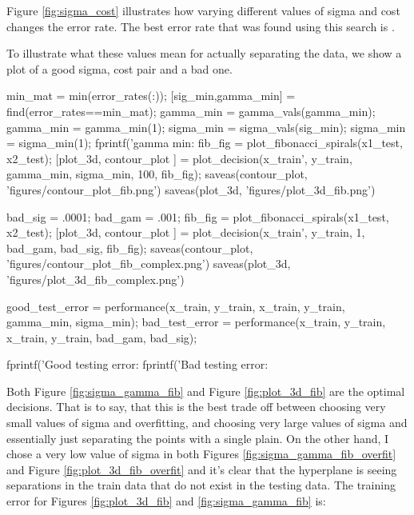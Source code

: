 \documentclass[11pt, twoside]{article}   	%
\newenvironment{matlab}{\comment}{\endcomment}
\begin{document}
Figure \ref{fig:sigma_cost} illustrates how varying different values of
sigma and cost changes the error rate. The best error rate that was found
using this search is .

To illustrate what these values mean for actually separating the data, we
show a plot of a good sigma, cost pair and a bad one. 

\begin{matlab}
min_mat = min(error_rates(:));
[sig_min,gamma_min] = find(error_rates==min_mat);
gamma_min = gamma_vals(gamma_min);
gamma_min = gamma_min(1); 
sigma_min = sigma_vals(sig_min);
sigma_min = sigma_min(1); 
fprintf('gamma min: %
fib_fig = plot_fibonacci_spirals(x1_test, x2_test); 
[plot_3d, contour_plot ] = plot_decision(x_train', y_train, gamma_min, sigma_min, 100, fib_fig);
saveas(contour_plot, 'figures/contour_plot_fib.png')
saveas(plot_3d, 'figures/plot_3d_fib.png')

bad_sig = .0001;
bad_gam = .001;
fib_fig = plot_fibonacci_spirals(x1_test, x2_test);
[plot_3d, contour_plot ] = plot_decision(x_train', y_train, 1, bad_gam, bad_sig, fib_fig);
saveas(contour_plot, 'figures/contour_plot_fib_complex.png')
saveas(plot_3d, 'figures/plot_3d_fib_complex.png')

good_test_error = performance(x_train, y_train, x_train, y_train, gamma_min, sigma_min);
bad_test_error = performance(x_train, y_train, x_train, y_train, bad_gam, bad_sig);

fprintf('Good testing error: %
fprintf('Bad testing error: %

\end{matlab}

Both Figure \ref{fig:sigma_gamma_fib} and Figure \ref{fig:plot_3d_fib} are
the optimal decisions. That is to say, that this is the best trade off
between choosing very small values of sigma and overfitting, and choosing
very large values of sigma and essentially just separating the points with
a single plain. On the other hand, I chose a very low value of sigma in
both Figures \ref{fig:sigma_gamma_fib_overfit} and Figure
\ref{fig:plot_3d_fib_overfit} and it's clear that the hyperplane is seeing
separations in the train data that do not exist in the testing data.  The training error
for Figures \ref{fig:plot_3d_fib} and \ref{fig:sigma_gamma_fib} is:

\color{lightgray}
\color{black}
\end{document}
